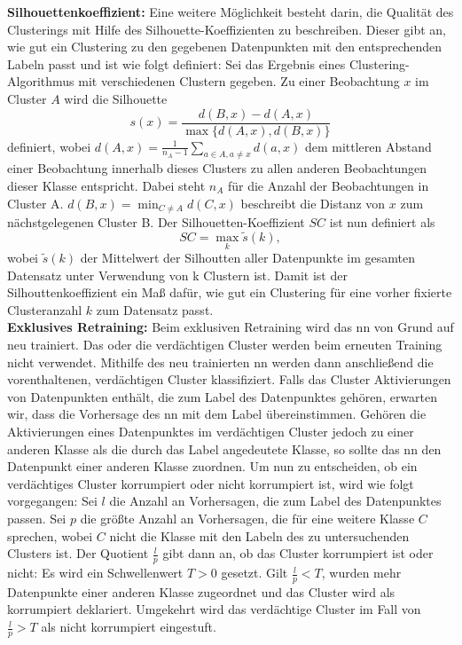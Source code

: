 \documentclass[twoside, 12pt,a4paper]{book}
\numberwithin{equation}{section}
\begin{document}
	\noindent \textbf{Silhouettenkoeffizient:} Eine weitere Möglichkeit besteht darin, die Qualität
	des Clusterings mit Hilfe des Silhouette-Koeffizienten zu beschreiben. Dieser gibt
	an, wie gut ein Clustering zu den gegebenen Datenpunkten mit den entsprechenden Labeln passt und ist wie folgt definiert: Sei das Ergebnis eines Clustering-Algorithmus mit verschiedenen Clustern gegeben. Zu einer Beobachtung $x$ im Cluster $A$ wird die Silhouette \begin{equation}
		s(x) = \frac{d(B,x)-d(A,x)}{\max\lbrace d(A,x), d(B,x) \rbrace}
	\end{equation} definiert, wobei $d(A,x)  = \frac{1}{n_A -1}\sum_{a \in A, a \neq x}{d(a,x)}$ dem mittleren Abstand einer Beobachtung innerhalb dieses Clusters zu allen anderen Beobachtungen dieser Klasse entspricht.
	Dabei steht $n_A$ für die Anzahl der Beobachtungen in Cluster A. $d(B,x) = \min_{C \neq A}d(C,x)$ beschreibt die Distanz von $x$ zum nächstgelegenen Cluster B. Der Silhouetten-Koeffizient $SC$ ist nun definiert als
	\begin{equation}
	SC = \max_k \tilde{s}(k),
	\end{equation}
	wobei $\tilde{s}(k)$ der Mittelwert der Silhoutten aller Datenpunkte im gesamten Datensatz unter Verwendung von k Clustern ist. Damit ist der Silhouttenkoeffizient ein Maß dafür, wie gut ein Clustering für eine vorher fixierte Clusteranzahl $k$ zum Datensatz passt.\\
	
	\noindent \textbf{Exklusives Retraining:} Beim exklusiven Retraining wird das \ac{nn}
	von Grund auf neu trainiert. Das oder die verdächtigen Cluster werden beim
	erneuten Training nicht verwendet. Mithilfe des neu trainierten \ac{nn} werden dann anschließend die vorenthaltenen, verdächtigen Cluster klassifiziert.
	Falls das Cluster Aktivierungen von Datenpunkten enthält, die zum Label des Datenpunktes gehören, erwarten wir, dass die Vorhersage des \ac{nn} mit
	dem Label übereinstimmen. Gehören die Aktivierungen eines Datenpunktes im
	verdächtigen Cluster jedoch zu einer anderen Klasse als die durch das Label
	angedeutete Klasse, so sollte das \ac{nn} den Datenpunkt einer anderen Klasse zuordnen. Um nun zu entscheiden, ob ein verdächtiges Cluster korrumpiert
	oder nicht korrumpiert ist, wird wie folgt vorgegangen: Sei $l$ die Anzahl an Vorhersagen, die zum Label des Datenpunktes passen. Sei $p$ die größte Anzahl an
	Vorhersagen, die für eine weitere Klasse $C$ sprechen, wobei $C$ nicht die Klasse mit den Labeln des zu untersuchenden Clusters ist. Der Quotient $\frac{l}{p}$ gibt
	dann an, ob das Cluster korrumpiert ist oder nicht: Es wird ein Schwellenwert
	$T > 0$ gesetzt. Gilt $\frac{l}{p} < T$, wurden mehr Datenpunkte einer anderen Klasse zugeordnet und das Cluster wird als korrumpiert deklariert. Umgekehrt wird das
	verdächtige Cluster im Fall von $\frac{l}{p} > T$ als nicht korrumpiert eingestuft.
	
\end{document}
